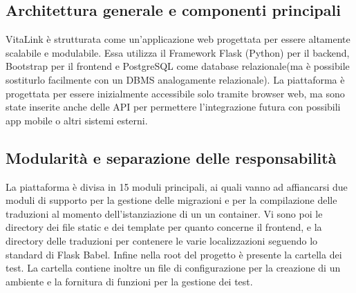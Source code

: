 \documentclass[12pt,a4paper,oneside]{report}
\begin{document}
\subsection{Architettura generale e componenti principali}
VitaLink è strutturata come un'applicazione web progettata per essere altamente scalabile e modulabile. Essa utilizza il Framework Flask (Python) per il backend, Bootstrap per il frontend e PostgreSQL come database relazionale(ma è possibile sostiturlo facilmente con un DBMS analogamente relazionale).
La piattaforma è progettata per essere inizialmente accessibile solo tramite browser web, ma sono state inserite anche delle API per permettere l'integrazione futura con possibili app mobile o altri sistemi esterni.
\subsection{Modularità e separazione delle responsabilità}
La piattaforma è divisa in 15 moduli principali, ai quali vanno ad affiancarsi due moduli di supporto per la gestione delle migrazioni e per la compilazione delle traduzioni al momento dell'istanziazione di un un container.
Vi sono poi le directory dei file static e dei template per quanto concerne il frontend, e la directory delle traduzioni per contenere le varie localizzazioni seguendo lo standard di Flask Babel.
Infine nella root del progetto è presente la cartella dei test. La cartella contiene inoltre un file di configurazione per la creazione di un ambiente e la fornitura di funzioni per la gestione dei test.
\vspace{1em}
\end{document}
